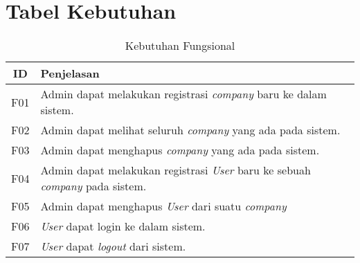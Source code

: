 \chapter{Tabel Kebutuhan}

\bgroup
\begin{table}[ht]
  \def\arraystretch{1.5}
  \caption{Kebutuhan Fungsional}
  \label{tab:kebutuhan-fungsional}
  \centering
  \begin{tabular}{|c|p{12cm}|}
    \hline
    ID  & Penjelasan                                                                                                      \\
    \hline
    F01 & Admin dapat melakukan registrasi \textit{company} baru ke dalam sistem.                                         \\
    \hline
    F02 & Admin dapat melihat seluruh \textit{company} yang ada pada sistem.                                              \\
    \hline
    F03 & Admin dapat menghapus \textit{company} yang ada pada sistem.                                                    \\
    \hline
    F04 & Admin dapat melakukan registrasi \textit{User} baru ke sebuah \textit{company} pada sistem.
    \\
    \hline
    F05 & Admin dapat menghapus \textit{User} dari suatu \textit{company}
    \\
    \hline
    F06 & \textit{User} dapat login ke dalam sistem.
    \\
    \hline
    F07 & \textit{User} dapat \textit{logout} dari sistem.


\end{tabular}
\end{table}
